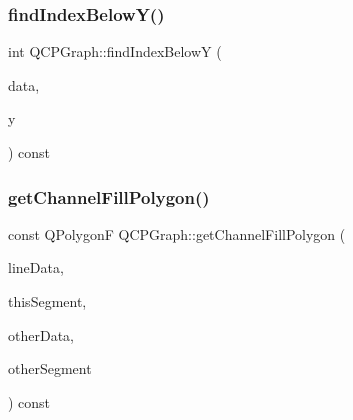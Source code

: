 \mbox{\label{class_q_c_p_graph_a5b0291f248e8ca8eaa82833ab420dcd0}} 
\subsubsection{\texorpdfstring{find\+Index\+Below\+Y()}{findIndexBelowY()}}
{\footnotesize\ttfamily int Q\+C\+P\+Graph\+::find\+Index\+BelowY (\begin{DoxyParamCaption}\item[{const Q\+Vector$<$ Q\+PointF $>$ $\ast$}]{data,  }\item[{double}]{y }\end{DoxyParamCaption}) const\hspace{0.3cm}{\ttfamily [protected]}}

\mbox{\label{class_q_c_p_graph_a9a5bdd5cb695d95d3eea80cfe96c5118}} 
\subsubsection{\texorpdfstring{get\+Channel\+Fill\+Polygon()}{getChannelFillPolygon()}}
{\footnotesize\ttfamily const Q\+PolygonF Q\+C\+P\+Graph\+::get\+Channel\+Fill\+Polygon (\begin{DoxyParamCaption}\item[{const Q\+Vector$<$ Q\+PointF $>$ $\ast$}]{line\+Data,  }\item[{\hyperlink{class_q_c_p_data_range}{Q\+C\+P\+Data\+Range}}]{this\+Segment,  }\item[{const Q\+Vector$<$ Q\+PointF $>$ $\ast$}]{other\+Data,  }\item[{\hyperlink{class_q_c_p_data_range}{Q\+C\+P\+Data\+Range}}]{other\+Segment }\end{DoxyParamCaption}) const\hspace{0.3cm}{\ttfamily [protected]}}

\mbox{\label{class_q_c_p_graph_a13f2c756f3114703159c2e604783e208}} 
